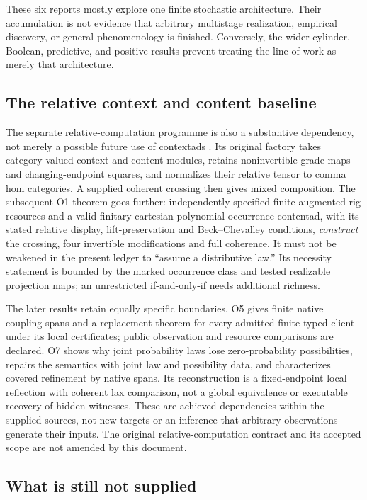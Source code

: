 \documentclass[11pt]{article}
\theoremstyle{remark}
\begin{document}
These six reports mostly explore one finite stochastic architecture. Their accumulation is not evidence that arbitrary multistage realization, empirical discovery, or general phenomenology is finished. Conversely, the wider cylinder, Boolean, predictive, and positive results prevent treating the line of work as merely that architecture.

\subsection{The relative context and content baseline}
\label{sec:relative-baseline}

The separate relative-computation programme is also a substantive dependency, not merely a possible future use of contextads \cite{RelativeConstruction,RelativeDossier}. Its original factory takes category-valued context and content modules, retains noninvertible grade maps and changing-endpoint squares, and normalizes their relative tensor to comma hom categories. A supplied coherent crossing then gives mixed composition. The subsequent O1 theorem goes further: independently specified finite augmented-rig resources and a valid finitary cartesian-polynomial occurrence contentad, with its stated relative display, lift-preservation and Beck--Chevalley conditions, \emph{construct} the crossing, four invertible modifications and full coherence. It must not be weakened in the present ledger to ``assume a distributive law.'' Its necessity statement is bounded by the marked occurrence class and tested realizable projection maps; an unrestricted if-and-only-if needs additional richness.

The later results retain equally specific boundaries. O5 gives finite native coupling spans and a replacement theorem for every admitted finite typed client under its local certificates; public observation and resource comparisons are declared. O7 shows why joint probability laws lose zero-probability possibilities, repairs the semantics with joint law and possibility data, and characterizes covered refinement by native spans. Its reconstruction is a fixed-endpoint local reflection with coherent lax comparison, not a global equivalence or executable recovery of hidden witnesses. These are achieved dependencies within the supplied sources, not new targets or an inference that arbitrary observations generate their inputs. The original relative-computation contract and its accepted scope are not amended by this document.

\subsection{What is still not supplied}
\end{document}
